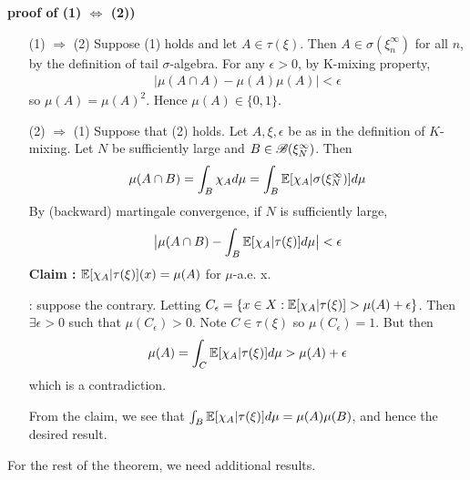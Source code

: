 \documentclass[12pt,a4paper]{report}
\newenvironment{proof}
{\begin{changemargin}{1cm}{0.5cm} 
	}%
	{\end{changemargin}
}
\newenvironment{subproof}
{\begin{changemargin}{0.5cm}{0.5cm}
	}%
	{\end{changemargin}
}
\begin{document}
\begin{proof}
\textbf{proof of (1) $\Leftrightarrow$ (2))} \begin{itemize}
\item[(1) $\Rightarrow$ (2)] Suppose (1) holds and let $A\in \tau(\xi)$. Then $A \in \sigma(\xi^{\infty}_n)$ for all $n$, by the definition of tail $\sigma$-algebra. For any $\epsilon >0$, by K-mixing property,
\begin{align*}
| \mu(A \cap A) - \mu(A) \mu(A)| < \epsilon
\end{align*}
so $\mu(A) = \mu(A)^2$. Hence $\mu(A) \in \{0,1\}$.
\item[(2) $\Rightarrow$ (1)] Suppose that (2) holds. Let $A, \xi, \epsilon$ be as in the definition of $K$-mixing. Let $N$ be sufficiently large and $B\in \mathscr{B}(\xi_N^{\infty})$. Then
\begin{align*}
\mu(A \cap B) = \int_B \chi_A d\mu = \int_B \mathbb{E}[ \chi_A | \sigma(\xi_N^{\infty})]  d\mu
\end{align*}
By (backward) martingale convergence, if $N$ is sufficiently large,
\begin{align*}
\big| \mu(A \cap B) - \int_B \mathbb{E}[\chi_A | \tau (\xi)] d\mu \big| < \epsilon
\end{align*}
\textbf{Claim :} $\mathbb{E}[\chi_A | \tau(\xi)] (x) = \mu(A)$ for $\mu$-a.e. x.
\begin{subproof}
: suppose the contrary. Letting $C_{\epsilon} = \{ x\in X : \mathbb{E}[\chi_A | \tau(\xi)] > \mu(A) + \epsilon  \}$. Then $\exists \epsilon >0$ such that $\mu(C_{\epsilon}) >0$. Note $C \in \tau(\xi)$ so $\mu(C_{\epsilon})=1$. But then
\begin{align*}
\mu(A) =\int_C \mathbb{E}[ \chi_A | \tau(\xi)] d\mu > \mu(A) + \epsilon
\end{align*}
which is a contradiction.
\end{subproof}
From the claim, we see that $\int_B \mathbb{E}[\chi_A |\tau(\xi)] d\mu = \mu(A) \mu(B)$, and hence the desired result.
\end{itemize}
\end{proof}
\s

For the rest of the theorem, we need additional results.
\s
\end{document}
